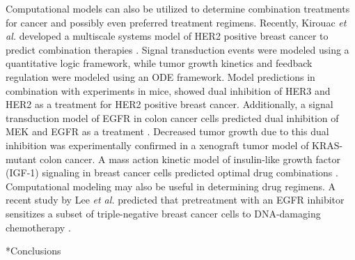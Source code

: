 \documentclass[12pt]{article}
\makeatletter
\renewcommand\section{\@startsection
	{subsection}{2}{0mm}
	{-0.2in}
	{0.05\baselineskip}
	{\normalfont\large\bfseries}}
\makeatother
\begin{document}
Computational models can also be utilized to determine combination treatments for cancer and possibly even preferred treatment regimens. Recently, Kirouac \textit{et al.} developed a multiscale systems model of HER2 positive breast cancer to predict combination therapies \cite{Kirouac2013}. Signal transduction events were modeled using a quantitative logic framework, while tumor growth kinetics and feedback regulation were modeled using an ODE framework. Model predictions in combination with experiments in mice, showed dual inhibition of HER3 and HER2 as a treatment for HER2 positive breast cancer. Additionally, a signal transduction model of EGFR in colon cancer cells predicted dual inhibition of MEK and EGFR as a treatment \cite{Klinger2013}. Decreased tumor growth due to this dual inhibition was experimentally confirmed in a xenograft tumor model of KRAS-mutant colon cancer. A mass action kinetic model of insulin-like growth factor (IGF-1) signaling in breast cancer cells predicted optimal drug combinations \cite{Iadevaia2010}. Computational modeling may also be useful in determining drug regimens. A recent study by Lee \textit{et al.} predicted that pretreatment with an EGFR inhibitor sensitizes a subset of triple-negative breast cancer cells to DNA-damaging chemotherapy \cite{Lee2012}. 


\section*{Conclusions}


\clearpage





\end{document}
